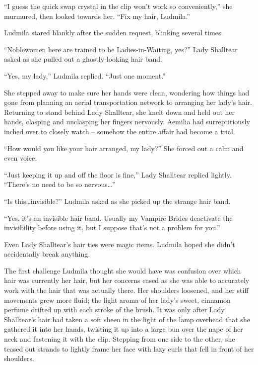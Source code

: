 

“I guess the quick swap crystal in the clip won’t work so conveniently,” she murmured, then looked towards her. “Fix my hair, Ludmila.”

 

Ludmila stared blankly after the sudden request, blinking several times.

 

“Noblewomen here are trained to be Ladies-in-Waiting, yes?” Lady Shalltear asked as she pulled out a ghostly-looking hair band.

 

“Yes, my lady,” Ludmila replied. “Just one moment.”

 

She stepped away to make sure her hands were clean, wondering how things had gone from planning an aerial transportation network to arranging her lady’s hair. Returning to stand behind Lady Shalltear, she knelt down and held out her hands, clasping and unclasping her fingers nervously. Aemilia had surreptitiously inched over to closely watch – somehow the entire affair had become a trial.

 

“How would you like your hair arranged, my lady?” She forced out a calm and even voice.

 

“Just keeping it up and off the floor is fine,” Lady Shalltear replied lightly. “There’s no need to be so nervous…”

 

“Is this…invisible?” Ludmila asked as she picked up the strange hair band.

 

“Yes, it’s an invisible hair band. Usually my Vampire Brides deactivate the invisibility before using it, but I suppose that’s not a problem for you.”

 

Even Lady Shalltear’s hair ties were magic items. Ludmila hoped she didn’t accidentally break anything.

 

The first challenge Ludmila thought she would have was confusion over which hair was currently her hair, but her concerns eased as she was able to accurately work with the hair that was actually there. Her shoulders loosened, and her stiff movements grew more fluid; the light aroma of her lady’s sweet, cinnamon perfume drifted up with each stroke of the brush. It was only after Lady Shalltear’s hair had taken a soft sheen in the light of the lamp overhead that she gathered it into her hands, twisting it up into a large bun over the nape of her neck and fastening it with the clip. Stepping from one side to the other, she teased out strands to lightly frame her face with lazy curls that fell in front of her shoulders.

